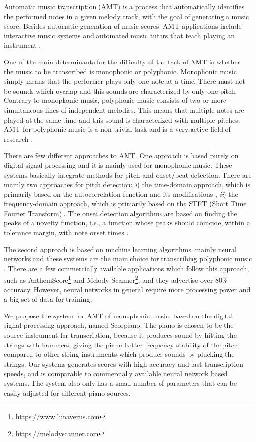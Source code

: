 \documentclass[conference]{IEEEtran}
\begin{document}
Automatic music transcription (AMT) is a process that automatically identifies the performed notes in a given melody track, with the goal of generating a music score.
Besides automatic generation of music scores, AMT applications include interactive music systems and automated music tutors that teach playing an instrument \cite{AMT:1, AMT:2}.

One of the main determinants for the difficulty of the task of AMT is whether the music to be transcribed is monophonic or polyphonic.
Monophonic music simply means that the performer plays only one note at a time. 
There must not be sounds which overlap and this sounds are characterized by only one pitch.
Contrary to monophonic music, polyphonic music consists of two or more simultaneous lines of independent melodies.
This means that multiple notes are played at the same time and this sound is characterized with multiple pitches.
AMT for polyphonic music is a non-trivial task and is a very active field of research \cite{AMT:2, AMTpoly:1, AMTpoly:2}.

There are few different approaches to AMT.
One approach is based purely on digital signal processing and it is mainly used for monophonic music. 
These systems basically integrate methods for pitch and onset/beat detection.
There are mainly two approaches for pitch detection: \emph{i}) the time-domain approach, which is primarily based on the autocorrelation function and its modifications \cite{PITCHm:1, YIN:1}, \emph{ii}) the frequency-domain approach, which is primarily based on the STFT (Short Time Fourier Transform) \cite{PITCHf:1}.
The onset detection algorithms are based on finding the peaks of a novelty function, i.e., a function whose peaks should coincide, within a tolerance margin, with note onset times \cite{ONSET:2}.

The second approach is based on machine learning algorithms, mainly neural networks and these systems are the main choice for transcribing polyphonic music \cite{AMTML:1}.
There are a few commercially available applications which follow this approach, such as AnthemScore\footnote{\url{https://www.lunaverus.com}} and Melody Scanner\footnote{\url{https://melodyscanner.com}}, and they advertise over 80\% accuracy.
However, neural networks in general require more processing power and a big set of data for training.

We propose the system for AMT of monophonic music, based on the digital signal processing approach, named Scorpiano.
The piano is chosen to be the source instrument for transcription, because it produces sound by hitting the strings with hammers, giving the piano better frequency stability of the pitch, compared to other string instruments which produce sounds by plucking the strings.
Our systems generates scores with high accuracy and fast transcription speeds, and is comparable to commercially available neural network based systems.
The system also only has a small number of parameters that can be easily adjusted for different piano sources.
\end{document}
